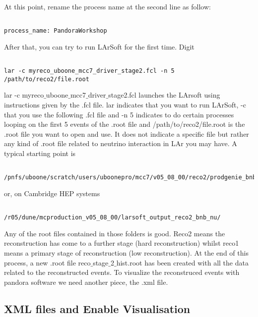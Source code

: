At this point, rename the process name at the second line as follow:

\begin{verbatim}

process_name: PandoraWorkshop

\end{verbatim}

After that, you can try to run LArSoft for the first time. Digit

\begin{verbatim}

lar -c myreco_uboone_mcc7_driver_stage2.fcl -n 5 /path/to/reco2/file.root 

\end{verbatim}

lar -c myreco${\_}$uboone${\_}$mcc7${\_}$driver${\_}$stage2.fcl launches the LArsoft using instructions given by the .fcl file. lar indicates that you want to run LArSoft, -c that you use the following .fcl file and -n 5 indicates to do certain processes looping on the first 5 events of the .root file and /path/to/reco2/file.root is the .root file you want to open and use. It does not indicate a specific file but rather any kind of .root file related to neutrino interaction in LAr you may have. A typical starting point is 

\begin{verbatim}

/pnfs/uboone/scratch/users/uboonepro/mcc7/v05_08_00/reco2/prodgenie_bnb_nu_uboone

\end{verbatim}

or, on Cambridge HEP systems

\begin{verbatim}

/r05/dune/mcproduction_v05_08_00/larsoft_output_reco2_bnb_nu/

\end{verbatim}

Any of the root files contained in those folders is good. Reco2 means the reconstruction has come to a further stage (hard reconstruction) whilst reco1 means a primary stage of reconstruction (low reconstruction). At the end of this process, a new .root file reco${\_}$stage${\_}$2${\_}$hist.root has been created with all the data related to the reconstructed events.  To visualize the reconstruced events with pandora software we need another piece, the .xml file. 

\subsection{XML files and Enable Visualisation}  \label{sssec:xml}  

